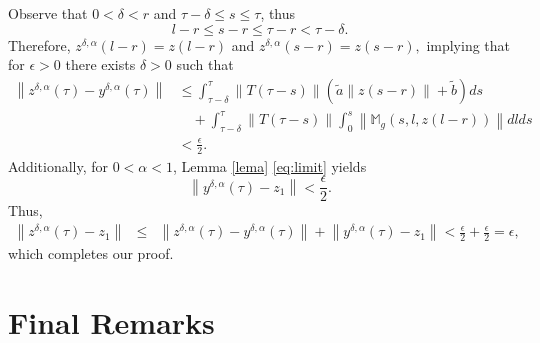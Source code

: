\documentclass[11 pt]{amsart}
\begin{document}
Observe that
 $0< \delta< r$ and $\tau-\delta \leq s\leq \tau$, thus $$l-r \leq s-r \leq \tau-r< \tau-\delta.
 $$
Therefore,
$
z^{\delta,\alpha}(l-r)=z(l-r) $  and $ z^{\delta,\alpha}(s-r)=z(s-r),
$ implying that for $\epsilon>0$ there exists $\delta>0$ such that
\begin{align*}
 {\left\| {z^{\delta,\alpha}(\tau)-y^{\delta,\alpha}(\tau)}\right\|} & \leq \int_{\tau-\delta}^{\tau}{\left\| { T(\tau-s)}\right\|}\left( \tilde{a}{\left\| {z(s-r)}\right\|}+\tilde{b}\right)ds \\
  &\quad +  \int_{\tau-\delta}^{\tau}{\left\| {T(\tau-s)}\right\|}\int_{0}^{s}{\left\| { {\mathbb{M}_g}(s,l,z(l-r))}\right\|} dlds  \\
   & <  \displaystyle\frac{\epsilon}{2}.
\end{align*}
Additionally, for $0<\alpha <1$, Lemma \ref{lema}  \eqref{eq:limit} yields
$$
 {\left\| { y^{\delta,\alpha}(\tau)-z_{1}}\right\|}  <  \frac{\epsilon}{2}.
$$
Thus,
$$
\begin{array}{lll}
 {\left\| { z^{\delta,\alpha}(\tau)-z_{1}}\right\|}  & \leq &  {\left\| { z^{\delta,\alpha}(\tau)-y^{\delta,\alpha}(\tau)}\right\|} +  {\left\| { y^{\delta,\alpha}(\tau)-z_{1}}\right\|}  <  \frac{\epsilon}{2}+ \frac{\epsilon}{2}=\epsilon,
\end{array}
$$
which completes our proof.
\section{Final Remarks}\label{final}
\noindent
\end{document}

